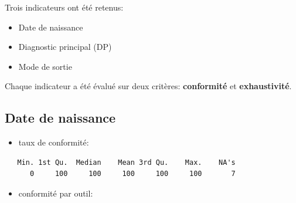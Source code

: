 \documentclass[]{article}
\providecommand{\tightlist}{%
  \setlength{\itemsep}{0pt}\setlength{\parskip}{0pt}}
\begin{document}
Trois indicateurs ont été retenus:

\begin{itemize}
\tightlist
\item
  Date de naissance
\item
  Diagnostic principal (DP)
\item
  Mode de sortie
\end{itemize}

Chaque indicateur a été évalué sur deux critères: \textbf{conformité} et
\textbf{exhaustivité}.

\subsection{Date de naissance}\label{date-de-naissance}

\begin{itemize}
\tightlist
\item
  taux de conformité:
\end{itemize}

\begin{verbatim}
   Min. 1st Qu.  Median    Mean 3rd Qu.    Max.    NA's 
      0     100     100     100     100     100       7 
\end{verbatim}

\begin{itemize}
\tightlist
\item
  conformité par outil:
\end{itemize}
\end{document}
